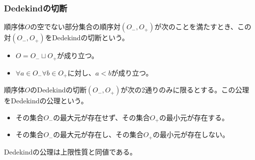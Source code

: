 \documentclass[dvipdfmx]{jsarticle}
\begin{document}
\subsubsection{Dedekindの切断}%
\begin{dfn}
順序体$O$の空でない部分集合の順序対$\left( O_{-},O_{+} \right)$が次のことを満たすとき、この対$\left( O_{-},O_{+} \right)$をDedekindの切断という。
\begin{itemize}
\item
  $O = O_{-} \sqcup O_{+}$が成り立つ。
\item
  $\forall a \in O_{-}\forall b \in O_{+}$に対し、$a < b$が成り立つ。
\end{itemize}
\end{dfn}
\begin{axs}[Dedekindの公理]
順序体$O$のDedekindの切断$\left( O_{-},O_{+} \right)$が次の2通りのみに限るとする。この公理をDedekindの公理という。
\begin{itemize}
\item
  その集合$O_{-}$の最大元が存在せず、その集合$O_{+}$の最小元が存在する。
\item
  その集合$O_{-}$の最大元が存在し、その集合$O_{+}$の最小元が存在しない。
\end{itemize}
\end{axs}
\begin{thm}\label{4.1.1.18} Dedekindの公理は上限性質と同値である。
\end{thm}
\end{document}
